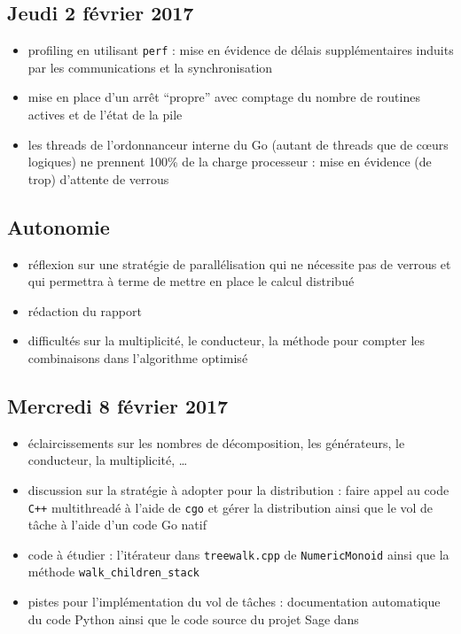 \documentclass[12pt,a4paper]{report}
\begin{document}
\subsection*{Jeudi 2 février 2017}
\begin{itemize}
	\item	profiling en utilisant \verb|perf| : mise en évidence de délais supplémentaires induits par les communications et la synchronisation
	\item	mise en place d'un arrêt ``propre'' avec comptage du nombre de routines actives et de l'état de la pile
	\item	les threads de l'ordonnanceur interne du Go (autant de threads que de cœurs logiques) ne prennent 100\% de la charge processeur : mise en évidence (de trop) d'attente de verrous
\end{itemize}

\subsection*{Autonomie}
\begin{itemize}
	\item	réflexion sur une stratégie de parallélisation qui ne nécessite pas de verrous et qui permettra à terme de mettre en place le calcul distribué
	\item	rédaction du rapport
	\item	difficultés sur la multiplicité, le conducteur, la méthode pour compter les combinaisons dans l'algorithme optimisé
\end{itemize}

\subsection*{Mercredi 8 février 2017}
\begin{itemize}
	\item	éclaircissements sur les nombres de décomposition, les générateurs, le conducteur, la multiplicité, \dots
	\item	discussion sur la stratégie à adopter pour la distribution : faire appel au code \texttt{C++} multithreadé à l'aide de \texttt{cgo} et gérer la distribution ainsi que le vol de tâche à l'aide d'un code Go natif
	\item	code à étudier : l'itérateur dans \texttt{treewalk.cpp} de \texttt{NumericMonoid} ainsi que la méthode \texttt{walk\_children\_stack}
	\item	pistes pour l'implémentation du vol de tâches : documentation automatique du code Python ainsi que le code source du projet Sage dans 
\end{itemize}
\end{document}
